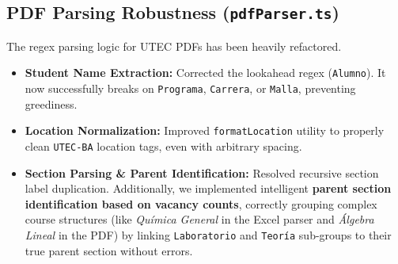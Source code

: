 \documentclass[12pt,a4paper]{article}
\begin{document}
\subsection{PDF Parsing Robustness (\texttt{pdfParser.ts})}
The regex parsing logic for UTEC PDFs has been heavily refactored.
\begin{itemize}[label=\textcolor{blue}{\textbullet}]
    \item \textbf{Student Name Extraction:} Corrected the lookahead regex (\texttt{Alumno}). It now successfully breaks on \texttt{Programa}, \texttt{Carrera}, or \texttt{Malla}, preventing greediness.
    \item \textbf{Location Normalization:} Improved \texttt{formatLocation} utility to properly clean \texttt{UTEC-BA} location tags, even with arbitrary spacing.
    \item \textbf{Section Parsing \& Parent Identification:} Resolved recursive section label duplication. Additionally, we implemented intelligent \textbf{parent section identification based on vacancy counts}, correctly grouping complex course structures (like \textit{Química General} in the Excel parser and \textit{Álgebra Lineal} in the PDF) by linking \texttt{Laboratorio} and \texttt{Teoría} sub-groups to their true parent section without errors.
\end{itemize}
\end{document}
